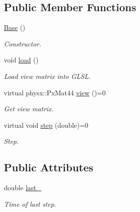 \subsection*{\-Public \-Member \-Functions}
\begin{DoxyCompactItemize}
\item 
\hypertarget{classNeb_1_1Camera_1_1View_1_1Base_a4824e00fe745e7d7b6bef00daaf6f191}{\hyperlink{classNeb_1_1Camera_1_1View_1_1Base_a4824e00fe745e7d7b6bef00daaf6f191}{\-Base} ()}\label{classNeb_1_1Camera_1_1View_1_1Base_a4824e00fe745e7d7b6bef00daaf6f191}

\begin{DoxyCompactList}\small\item\em \-Constructor. \end{DoxyCompactList}\item 
\hypertarget{classNeb_1_1Camera_1_1View_1_1Base_a55338f0f215524b7c026fff7d08bbdcb}{void \hyperlink{classNeb_1_1Camera_1_1View_1_1Base_a55338f0f215524b7c026fff7d08bbdcb}{load} ()}\label{classNeb_1_1Camera_1_1View_1_1Base_a55338f0f215524b7c026fff7d08bbdcb}

\begin{DoxyCompactList}\small\item\em \-Load view matrix into \-G\-L\-S\-L. \end{DoxyCompactList}\item 
\hypertarget{classNeb_1_1Camera_1_1View_1_1Base_ad7609a0b61cd9fb9c54cb3b01335b764}{virtual physx\-::\-Px\-Mat44 \hyperlink{classNeb_1_1Camera_1_1View_1_1Base_ad7609a0b61cd9fb9c54cb3b01335b764}{view} ()=0}\label{classNeb_1_1Camera_1_1View_1_1Base_ad7609a0b61cd9fb9c54cb3b01335b764}

\begin{DoxyCompactList}\small\item\em \-Get view matrix. \end{DoxyCompactList}\item 
virtual void \hyperlink{classNeb_1_1Camera_1_1View_1_1Base_aa3c5978efc6cd916f0f91bb8def375c5}{step} (double)=0
\begin{DoxyCompactList}\small\item\em \-Step. \end{DoxyCompactList}\end{DoxyCompactItemize}
\subsection*{\-Public \-Attributes}
\begin{DoxyCompactItemize}
\item 
\hypertarget{classNeb_1_1Camera_1_1View_1_1Base_a931b1ed0302ee399c970740177c2e2de}{double \hyperlink{classNeb_1_1Camera_1_1View_1_1Base_a931b1ed0302ee399c970740177c2e2de}{last\-\_\-}}\label{classNeb_1_1Camera_1_1View_1_1Base_a931b1ed0302ee399c970740177c2e2de}

\begin{DoxyCompactList}\small\item\em \-Time of last step. \end{DoxyCompactList}\end{DoxyCompactItemize}


